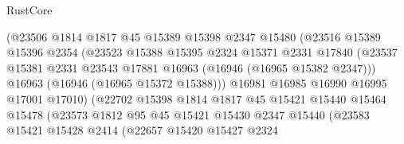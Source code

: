 \begin{lexlean}{RustCore}
\begin{coremodule}
                                (@23506
                                  @1814
                                  @1817
                                  @45
                                  @15389
                                  @15398
                                  @2347
                                  @15480
                                  (@23516
                                    @15389
                                    @15396
                                    @2354
                                    (@23523
                                      @15388
                                      @15395
                                      @2324
                                      @15371
                                      @2331
                                      @17840
                                      (@23537
                                        @15381
                                        @2331
                                        @23543
                                        @17881
                                        @16963
                                        (@16946 (@16965 @15382 @2347)))
                                      @16963
                                      (@16946 (@16965 @15372 @15388)))
                                    @16981
                                    @16985
                                    @16990
                                    @16995
                                    @17001
                                    @17010)
                                  (@22702
                                    @15398
                                    @1814
                                    @1817
                                    @45
                                    @15421
                                    @15440
                                    @15464
                                    @15478
                                    (@23573
                                      @1812
                                      @95
                                      @45
                                      @15421
                                      @15430
                                      @2347
                                      @15440
                                      (@23583
                                        @15421
                                        @15428
                                        @2414
                                        (@22657
                                          @15420
                                          @15427
                                          @2324

\end{coremodule}
\end{lexlean}

